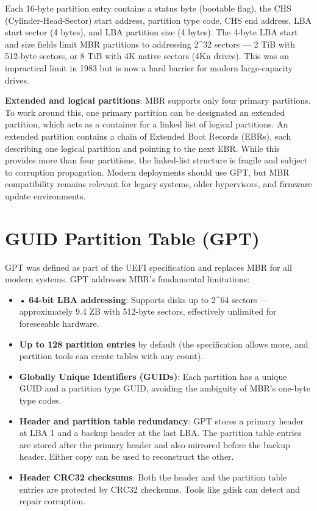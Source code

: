 Each 16-byte partition entry contains a status byte (bootable flag), the CHS (Cylinder-Head-Sector) start address, partition type code, CHS end address, LBA start sector (4 bytes), and LBA partition size (4 bytes). The 4-byte LBA start and size fields limit MBR partitions to addressing 2\^{}32 sectors --- 2 TiB with 512-byte sectors, or 8 TiB with 4K native sectors (4Kn drives). This was an impractical limit in 1983 but is now a hard barrier for modern large-capacity drives.

\textbf{Extended and logical partitions}: MBR supports only four primary partitions. To work around this, one primary partition can be designated an extended partition, which acts as a container for a linked list of logical partitions. An extended partition contains a chain of Extended Boot Records (EBRs), each describing one logical partition and pointing to the next EBR. While this provides more than four partitions, the linked-list structure is fragile and subject to corruption propagation. Modern deployments should use GPT, but MBR compatibility remains relevant for legacy systems, older hypervisors, and firmware update environments.

\section{GUID Partition Table (GPT)}
GPT was defined as part of the UEFI specification and replaces MBR for all modern systems. GPT addresses MBR's fundamental limitations:

\begin{itemize}
  \item • \textbf{64-bit LBA addressing}: Supports disks up to 2\^{}64 sectors --- approximately 9.4 ZB with 512-byte sectors, effectively unlimited for foreseeable hardware.
  \item \textbf{Up to 128 partition entries} by default (the specification allows more, and partition tools can create tables with any count).
  \item \textbf{Globally Unique Identifiers (GUIDs)}: Each partition has a unique GUID and a partition type GUID, avoiding the ambiguity of MBR's one-byte type codes.
  \item \textbf{Header and partition table redundancy}: GPT stores a primary header at LBA 1 and a backup header at the last LBA. The partition table entries are stored after the primary header and also mirrored before the backup header. Either copy can be used to reconstruct the other.
  \item \textbf{Header CRC32 checksums}: Both the header and the partition table entries are protected by CRC32 checksums. Tools like gdisk can detect and repair corruption.
\end{itemize}

